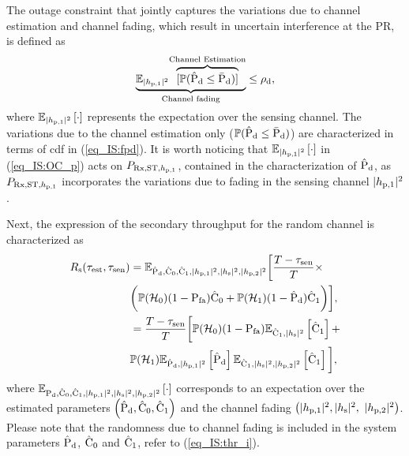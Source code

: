 The outage constraint that jointly captures the variations due to channel estimation and channel fading, which result in uncertain interference at the PR, is defined as 
\begin{align}
\smash[b]{\underbrace{\mathbb{E}_{\phpo}{\smash[b]{\overbrace{[\p( \epd \le \pdd)]}^{\text{Channel Estimation}}}}}_{\text{Channel fading}}} &\le \mpd, \label{eq_IS:OC_p} \\[-0.1em] \nonumber 
\end{align}
where $\e{\phpo}{\cdot}$ represents the expectation over the sensing channel. The variations due to the channel estimation only ($\p(\epd \le \pdd)$) are characterized in terms of cdf in (\ref{eq_IS:fpd}).
It is worth noticing that $\e{\phpo}{\cdot}$ in (\ref{eq_IS:OC_p}) acts on $\prcvdstpt$, contained in the characterization of $\epd$, as $\prcvdstpt$ incorporates the variations due to fading in the sensing channel $\phpo$.

Next, the expression of the secondary throughput for the random channel is characterized as 
\begin{align}
\rs(\test, \tsen) &= \mathbb{E}_{\epd,\ecz,\eco,\phpo, \phs, \phpt} \bigg[ \frac{T - \tsen}{T} \times \nonumber \\ & \bigg( \phz (1 - \pfa) \ecz + \pho (1 -\epd) \eco \bigg) \bigg], \label{eq_IS:thr_p} \\
  \quad &= \frac{T - \tsen}{T} \bigg[ \phz (1 - \pfa) \e{\eco, \phs}{\eco} + \nonumber \\ & \pho \e{\epd, \phpo}{\epd} \e{\eco, \phs, \phpt}{\eco} \bigg], \nonumber 
\end{align}
where $\e{\pd,\ecz,\eco,\phpo, \phs, \phpt}{\cdot}$ corresponds to an expectation over the estimated parameters $\left( \epd, \ecz, \eco \right)$ and the channel fading $\big(\phpo, \phs,$ $\phpt \big)$. Please note that the randomness due to channel fading is included in the system parameters $\epd$, $\ecz$ and $\eco$, refer to (\ref{eq_IS:thr_i}).

